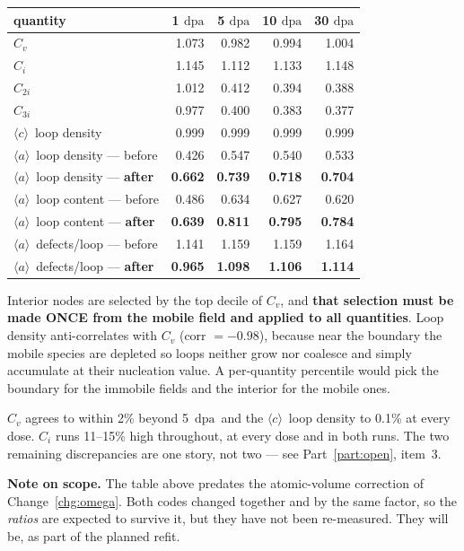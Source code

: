 \documentclass[11pt,a4paper]{article}
\newcommand{\dpa}{\ensuremath{\mathrm{dpa}}}
\newcommand{\aloop}{\ensuremath{\langle a\rangle}}
\newcommand{\cloop}{\ensuremath{\langle c\rangle}}
\newcounter{chg}
\begin{document}
\begin{center}
\begin{tabular}{lrrrr}
\toprule
quantity & 1 \dpa & 5 \dpa & 10 \dpa & 30 \dpa \\
\midrule
$C_v$   & 1.073 & 0.982 & 0.994 & 1.004 \\
$C_i$   & 1.145 & 1.112 & 1.133 & 1.148 \\
$C_{2i}$ & 1.012 & 0.412 & 0.394 & 0.388 \\
$C_{3i}$ & 0.977 & 0.400 & 0.383 & 0.377 \\
\cloop\ loop density & 0.999 & 0.999 & 0.999 & 0.999 \\
\aloop\ loop density --- before & 0.426 & 0.547 & 0.540 & 0.533 \\
\aloop\ loop density --- \textbf{after} & \textbf{0.662} & \textbf{0.739} & \textbf{0.718} & \textbf{0.704} \\
\aloop\ loop content --- before & 0.486 & 0.634 & 0.627 & 0.620 \\
\aloop\ loop content --- \textbf{after} & \textbf{0.639} & \textbf{0.811} & \textbf{0.795} & \textbf{0.784} \\
\aloop\ defects/loop --- before & 1.141 & 1.159 & 1.159 & 1.164 \\
\aloop\ defects/loop --- \textbf{after} & \textbf{0.965} & \textbf{1.098} & \textbf{1.106} & \textbf{1.114} \\
\bottomrule
\end{tabular}
\end{center}

\noindent
Interior nodes are selected by the top decile of $C_v$, and \textbf{that
selection must be made ONCE from the mobile field and applied to all
quantities}. Loop density anti-correlates with $C_v$ (corr $= -0.98$), because
near the boundary the mobile species are depleted so loops neither grow nor
coalesce and simply accumulate at their nucleation value. A per-quantity
percentile would pick the boundary for the immobile fields and the interior for
the mobile ones.

$C_v$ agrees to within 2\% beyond 5~\dpa\ and the \cloop\ loop density to 0.1\%
at every dose. $C_i$ runs 11--15\% high throughout, at every dose and in both
runs. The two remaining discrepancies are one story, not two --- see
Part~\ref{part:open}, item~3.

\medskip\noindent
\textbf{Note on scope.} The table above predates the atomic-volume correction
of Change~\ref{chg:omega}. Both codes changed together and by the same factor,
so the \emph{ratios} are expected to survive it, but they have not been
re-measured. They will be, as part of the planned refit.
\end{document}
